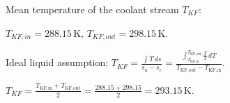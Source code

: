 Mean temperature of the coolant stream \( T_{KF} \):  

\( T_{KF,in} = 288.15 \, \text{K} \), \( T_{KF,out} = 298.15 \, \text{K} \).  

Ideal liquid assumption:  
\( T_{KF} = \frac{\int T \, ds}{s_a - s_e} = \frac{\int_{T_{\text{KF,in}}}^{T_{\text{KF,out}}} \frac{T}{T} \, dT}{T_{\text{KF,out}} - T_{\text{KF,in}}} \).  

\( T_{KF} = \frac{T_{\text{KF,in}} + T_{\text{KF,out}}}{2} = \frac{288.15 + 298.15}{2} = 293.15 \, \text{K} \).